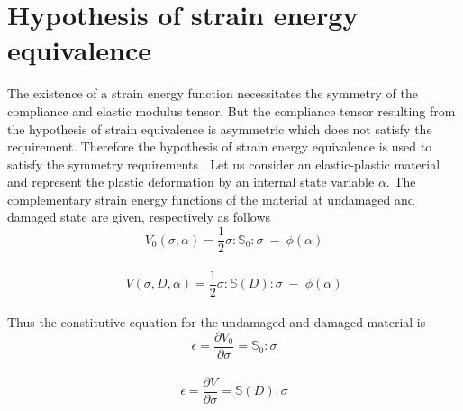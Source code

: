 \documentclass[12pt,openright,twoside]{report}
\begin{document}
\section{Hypothesis of strain energy equivalence}\label{Hypothesis of strain energy equivalence}
\indent\indent\indent The existence of a strain energy function necessitates the symmetry of the compliance and elastic modulus tensor. But the compliance tensor resulting from the hypothesis of strain equivalence is asymmetric which does not satisfy the requirement. Therefore the hypothesis of strain energy equivalence is used to satisfy the symmetry requirements \citep{cordebois1982damage}. Let us consider an elastic-plastic material and represent the plastic deformation by an internal state variable $\alpha$. The complementary strain energy functions of the material at undamaged and damaged state are given, respectively as follows
\\
\begin{equation}
V_{0}(\sigma,\alpha) = \frac{1}{2}\sigma : \mathbb{S}_{0} : \sigma \; - \; \phi(\alpha)
\end{equation}
\\
\begin{equation}
V(\sigma,D,\alpha) = \frac{1}{2}\sigma : \mathbb{S}(D) : \sigma \; - \; \phi(\alpha)
\end{equation}
\\
Thus the constitutive equation for the undamaged and damaged material is 
\\
\begin{equation}
\epsilon = \frac{\partial V_{0} }{\partial \sigma} = \mathbb{S}_{0} : \sigma
\end{equation}
\\
\begin{equation}
\epsilon = \frac{\partial V }{\partial \sigma} = \mathbb{S}(D) : \sigma
\label{eqn:Strain_energy_eq}
\end{equation}
\end{document}
